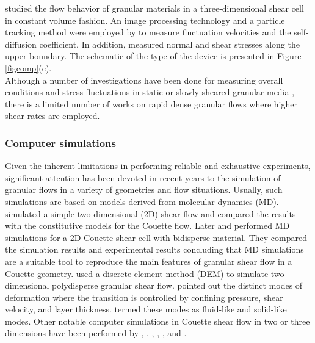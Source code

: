 \cite{Hsi04} studied the flow behavior of granular materials in a
three-dimensional shear cell in constant volume fashion. An image
processing technology and a particle tracking method were employed
by \citeauthor{Hsi04} to measure fluctuation velocities and the
self-diffusion coefficient. In addition, \citeauthor{Hsi04}
measured normal and shear stresses along the upper boundary. The
schematic of the type of the device is presented in Figure
\ref{figcomp}(c).\\

Although a number of investigations have been done for measuring
overall conditions and stress fluctuations in static or
slowly-sheared granular media \citep{Los01,Utt04}, there is a
limited number of works on rapid dense granular flows where higher
shear rates are employed.\\

\subsubsection{Computer simulations}

Given the inherent limitations in performing reliable and
exhaustive experiments, significant attention has been devoted in
recent years to the simulation of granular flows in a variety of
geometries  and flow situations. Usually, such simulations are
based on models derived from molecular dynamics (MD).\\

\cite{Cam84} simulated a simple two-dimensional
(2D) shear flow and
compared the results with the constitutive models for the Couette
flow. Later \cite{Sch99} and \cite{Lat00} performed MD simulations
for a 2D Couette shear cell with bidisperse material. They
compared the simulation results and experimental results
concluding that MD simulations are a suitable tool to reproduce
the main features of granular shear flow in a Couette geometry.
\cite{Aha02} used a discrete element method
(DEM) to simulate
two-dimensional polydisperse granular shear flow.
\citeauthor{Aha02} pointed out the distinct modes of deformation
where the transition is controlled by confining pressure, shear
velocity, and layer thickness. \citeauthor{Aha02} termed these
modes as fluid-like and solid-like modes. Other notable computer
simulations in Couette shear flow in two or three dimensions have
been performed by \cite{Sav93}, \cite{Lou94}, \cite{Lun94},
\cite{Jal00}, \cite{Jal03}, and \cite{Bar05}.\\

\cleardoublepage
